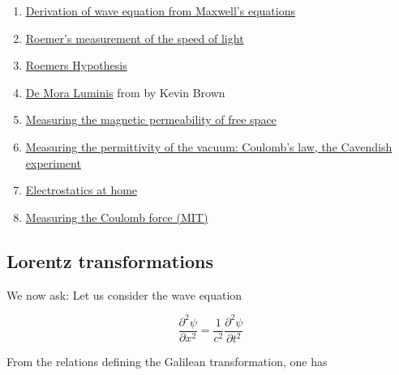 \begin{enumerate}

\item \href{http://www.santarosa.edu/~lwillia2/42/WaveEquationDerivation.pdf}{Derivation of wave equation from Maxwell's equations} 

\item \href{http://www.amnh.org/education/resources/rfl/web/essaybooks/cosmic/p_roemer.html}{Roemer's measurement of the speed of light}

\item \href{http://www.mathpages.com/home/kmath203/kmath203.htm}{Roemers  Hypothesis}

\item \href{http://www.mathpages.com/rr/s3-03/3-03.htm}{De Mora Luminis} from  by Kevin Brown

\item \href{http://physics.wooster.edu/JrIS/Files/Moore_Web_article.pdf}{Measuring the magnetic permeability of free space} 

\item \href{http://people.physics.tamu.edu/mcintyre/courses/phys208H/labs/Lab_1.pdf}{Measuring the permittivity of the vacuum: Coulomb's law, the Cavendish experiment }

\item \href{http://mysite.du.edu/~jcalvert/phys/elechome.htm}{Electrostatics at home}

\item  \href{http://ocw.mit.edu/courses/physics/8-02t-electricity-and-magnetism-spring-2005/labs/exp02.pdf}{Measuring the Coulomb force (MIT)}

\end{enumerate}



\subsection{Lorentz transformations}

We now ask:    Let us consider the wave equation

\begin{equation}
\frac{\partial^2 \psi}{\partial x^2}  
= 
\frac{1}{c^2} 
\frac{\partial^2 \psi}{\partial t^2}
\end{equation}

From the relations defining the Galilean transformation,
one has

